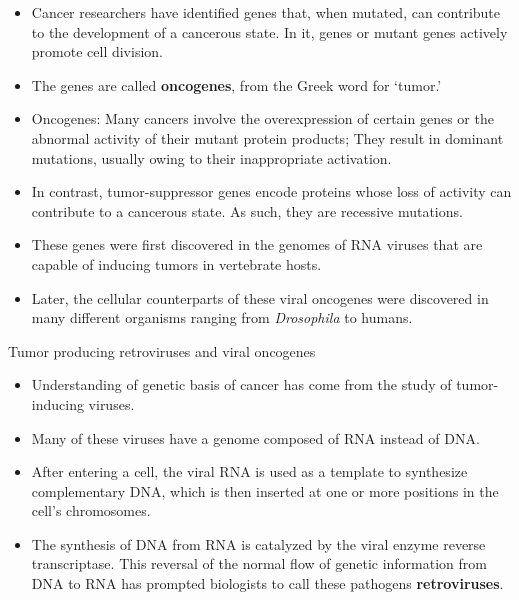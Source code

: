 \documentclass[11pt,dvipsnames,ignorenonframetext,aspectratio=169]{beamer}
\providecommand{\tightlist}{%
  \setlength{\itemsep}{0pt}\setlength{\parskip}{0pt}}
\begin{document}
\begin{frame}{}
\protect\hypertarget{section-11}{}

\begin{itemize}
\tightlist
\item
  Cancer researchers have identified genes that, when mutated, can
  contribute to the development of a cancerous state. In it, genes or
  mutant genes actively promote cell division.
\item
  The genes are called \textbf{oncogenes}, from the Greek word for
  `tumor.'
\item
  Oncogenes: Many cancers involve the overexpression of certain genes or
  the abnormal activity of their mutant protein products; They result in
  dominant mutations, usually owing to their inappropriate activation.
\item
  In contrast, tumor-suppressor genes encode proteins whose loss of
  activity can contribute to a cancerous state. As such, they are
  recessive mutations.
\item
  These genes were first discovered in the genomes of RNA viruses that
  are capable of inducing tumors in vertebrate hosts.
\item
  Later, the cellular counterparts of these viral oncogenes were
  discovered in many different organisms ranging from \emph{Drosophila}
  to humans.
\end{itemize}

\end{frame}

\begin{frame}{Tumor producing retroviruses and viral oncogenes}
\protect\hypertarget{tumor-producing-retroviruses-and-viral-oncogenes}{}

\begin{itemize}
\tightlist
\item
  Understanding of genetic basis of cancer has come from the study of
  tumor-inducing viruses.
\item
  Many of these viruses have a genome composed of RNA instead of DNA.
\item
  After entering a cell, the viral RNA is used as a template to
  synthesize complementary DNA, which is then inserted at one or more
  positions in the cell's chromosomes.
\item
  The synthesis of DNA from RNA is catalyzed by the viral enzyme reverse
  transcriptase. This reversal of the normal flow of genetic information
  from DNA to RNA has prompted biologists to call these pathogens
  \textbf{retroviruses}.
\end{itemize}

\end{frame}
\end{document}

